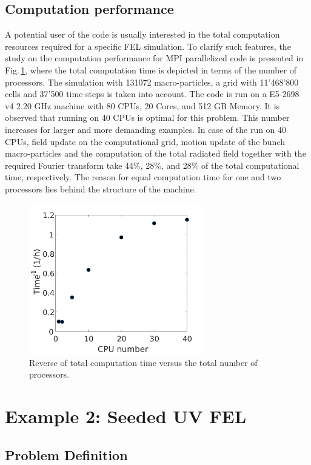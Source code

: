 \subsection{Computation performance}

A potential user of the code is usually interested in the total computation resources required for a specific FEL simulation.
%
To clarify such features, the study on the computation performance for MPI parallelized code is presented in Fig.\,\ref{computationPerformance}, where the total computation time is depicted in terms of the number of processors.
%
The simulation with 131072 macro-particles, a grid with 11'468'800 cells and 37'500 time steps is taken into account.
%
The code is run on a E5-2698 v4 \@ 2.20 GHz machine with 80 CPUs, 20 Cores, and 512 GB Memory.
%
It is observed that running on 40 CPUs is optimal for this problem.
%
This number increases for larger and more demanding examples.
%
In case of the run on 40 CPUs, field update on the computational grid, motion update of the bunch macro-particles and the computation of the total radiated field together with the required Fourier transform take 44\%, 28\%, and 28\% of the total computational time, respectively.
%
The reason for equal computation time for one and two processors lies behind the structure of the machine.
%
\begin{figure}
	\centering
	\includegraphics[width=3.0in]{./MITHRA_EXAMPLES/Fig5/Fig5.pdf}
	\caption{Reverse of total computation time versus the total number of processors.}
	\label{computationPerformance}
\end{figure}

\section{Example 2: Seeded UV FEL}

\subsection{Problem Definition}

